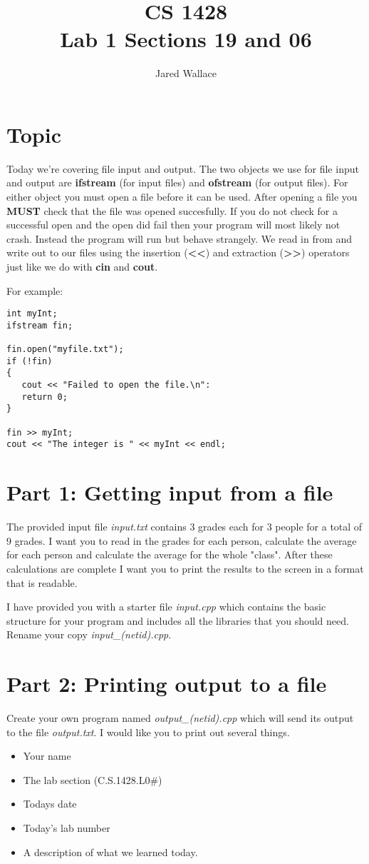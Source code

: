 \documentclass[letterpaper,12pt]{article}
\title{\Large CS 1428\\Lab 1 Sections 19 and 06}
\author{Jared Wallace}
\date{}
\begin{document}
\maketitle

\section*{Topic}
Today we're covering file input and output.  The two objects we use
for file input and output are \textbf{ifstream} (for input files) and 
\textbf{ofstream} (for output files). For either object you must open 
a file before it can be used.  After opening a file you \textbf{MUST} 
check that the file was opened succesfully.  If you do not check for a
successful open and the open did fail then your program will most 
likely not crash.  Instead the program will run but behave strangely. 
We read in from and write out to our files using the insertion 
(\textbf{\textless\textless}) and extraction (\textbf{\textgreater\textgreater}) operators just like we do 
with \textbf{cin} and \textbf{cout}.

For example:

\begin{lstlisting}
int myInt;
ifstream fin;

fin.open("myfile.txt");
if (!fin) 
{
   cout << "Failed to open the file.\n":
   return 0;
}

fin >> myInt;
cout << "The integer is " << myInt << endl;
\end{lstlisting}

\section*{Part 1: Getting input from a file}
The provided input file \emph{input.txt} contains 3 grades each for 3
people for a total of 9 grades.  I want you to read in the grades for 
each person, calculate the average for each person and calculate the 
average for the whole "class".  After these calculations are complete 
I want you to print the results to the screen in a format that is 
readable.

I have provided you with a starter file \emph{input.cpp} which
contains the basic structure for your program and includes all
the libraries that you should need. Rename your copy \emph{input\_(netid).cpp}.

\newpage
\section*{Part 2: Printing output to a file}
Create your own program named \emph{output\_(netid).cpp} which will send
its output to the file \emph{output.txt}. I would like you to print
out several things.
\begin{itemize}
   \item Your name
   \item The lab section (C.S.1428.L0\#)
   \item Todays date
   \item Today's lab number
   \item A description of what we learned today.
\end{itemize}
\end{document}
